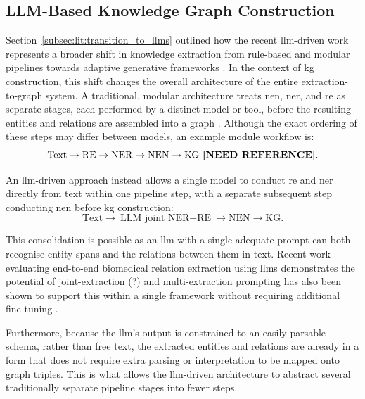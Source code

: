 \subsection{LLM-Based Knowledge Graph Construction}
\label{subsec:lit:llm_based_kg_construction}
Section~\ref{subsec:lit:transition_to_llms} outlined how the recent \gls{llm}-driven work represents a broader shift in knowledge extraction from rule-based and modular pipelines towards adaptive generative frameworks \cite{bian2025_llm_automation_shift}. In the context of \gls{kg} construction, this shift changes the overall architecture of the entire extraction-to-graph system. A traditional, modular architecture treats \gls{nen}, \gls{ner}, and \gls{re} as separate stages, each performed by a distinct model or tool, before the resulting entities and relations are assembled into a graph \pref. Although the exact ordering of these steps may differ between models, an example module workflow is:
\vspace{0.5em}
\[
\text{Text} \rightarrow \text{RE} \rightarrow \text{NER} \rightarrow \text{NEN} \rightarrow \text{KG} \ \textbf{[NEED REFERENCE]}.
\]

\vspace{0.5em}

An \gls{llm}-driven approach instead allows a single model to conduct \gls{re} and \gls{ner} directly from text within one pipeline step, with a separate subsequent step conducting \gls{nen} before \gls{kg} construction:
\vspace{0.5em}
\[
\text{Text} \rightarrow \boxed{\text{LLM joint NER} + \text{RE}} \rightarrow \text{NEN} \rightarrow \text{KG}.
\]

\vspace{0.5em}

This consolidation is possible as an \gls{llm} with a single adequate prompt can both recognise entity spans and the relations between them in text. Recent work evaluating end-to-end biomedical relation extraction using \glspl{llm} demonstrates the potential of joint-extraction \cite{brokman2025benchmark} (?) and multi-extraction prompting has also been shown to support this within a single framework without requiring additional fine-tuning \cite{labonte2026structured}.

Furthermore, because the \gls{llm}'s output is constrained to an easily-parsable schema, rather than free text, the extracted entities and relations are already in a form that does not require extra parsing or interpretation to be mapped onto graph triples. This is what allows the \gls{llm}-driven architecture to abstract several traditionally separate pipeline stages into fewer steps.

